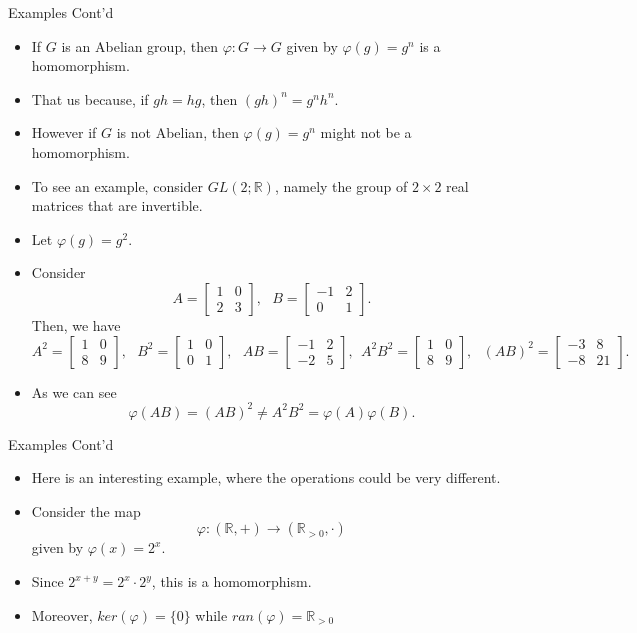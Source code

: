 \documentclass[ %
 10pt, xcolor={dvipsnames,svgnames,x11names,hyperref},
   hyperref={colorlinks=true,citecolor=green,linkcolor=DarkRed,urlcolor=ProcessBlue,anchorcolor=blue}
  ]{beamer}
\newenvironment{stepitemize}{\begin{itemize}[<+->]}{\end{itemize} }
\newcommand{\R}{\mathbb{R}}
\begin{document}
\begin{frame}{Examples Cont'd}
\begin{stepitemize}
    \item If $G$ is an Abelian group, then $\varphi:G\rightarrow G$ given by $\varphi(g)=g^n$ is a homomorphism.
    \item That us because, if $gh=hg$, then $(gh)^n=g^nh^n$.
    \item However if $G$ is not Abelian, then $\varphi(g)=g^n$ might not be a homomorphism. 
    \item To see an example, consider $GL(2;\R)$, namely the group of $2\times 2$ real matrices that are invertible. \item Let $\varphi(g)=g^2$. 
 \item Consider 
 $$ A=\begin{bmatrix}
    1&0\\
    2&3    \end{bmatrix}, \:\:\: B = \begin{bmatrix}
    -1&2\\
    0&1    \end{bmatrix}.$$
    Then, we have 
    \scriptsize{
    $$A^2 = \begin{bmatrix}
    1&0\\
    8&9    \end{bmatrix}, \:\:\: B^2 = \begin{bmatrix}
    1&0\\
    0&1    \end{bmatrix}, \:\:\: AB = \begin{bmatrix}
    -1&2\\
    -2&5    \end{bmatrix}, \:\: A^2B^2 = \begin{bmatrix}
    1&0\\
    8&9    \end{bmatrix}, \:\:\: (AB)^2 = \begin{bmatrix}
    -3&8\\
    -8&21    \end{bmatrix}.$$ }
    \item As we can see $$\varphi(AB) = (AB)^2 \neq A^2B^2 =\varphi(A)\varphi(B).$$
\end{stepitemize}
    
\end{frame}
\begin{frame}{Examples Cont'd}
\begin{stepitemize}
    \item Here is an interesting example, where the operations could be very different. 
    \item Consider the map 
$$\varphi: \left( \R, +\right) \rightarrow  \left (\R_{>0}, \cdot \right )$$ given by 
$\varphi(x)=2^x$. 
\item Since $2^{x+y} = 2^x\cdot 2^y$, this is a homomorphism. \item Moreover, $ker(\varphi) = \{0\}$ while $ran(\varphi) = \R_{>0}$

\end{stepitemize}
\end{frame}
\end{document}
